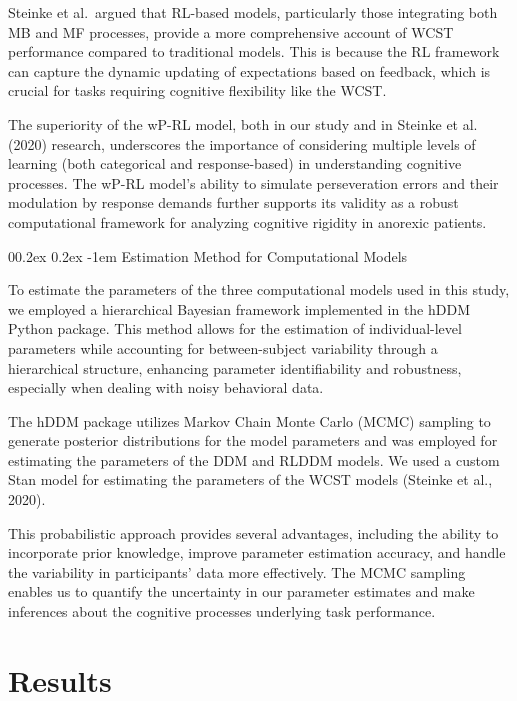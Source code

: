 \documentclass[
  man]{apa6}
\makeatletter
\let\oldparagraph\paragraph
\renewcommand{\paragraph}{
    \@ifstar
      \xxxParagraphStar
      \xxxParagraphNoStar
  }
\newcommand{\xxxParagraphStar}[1]{\oldparagraph*{#1}\mbox{}}
\newcommand{\xxxParagraphNoStar}[1]{\oldparagraph{#1}\mbox{}}
\renewcommand{\paragraph}{\@startsection{paragraph}{4}{\parindent}%
  {0\baselineskip \@plus 0.2ex \@minus 0.2ex}%
  {-1em}%
  {\normalfont\normalsize\bfseries\itshape\typesectitle}}
\makeatother
\begin{document}
Steinke et al.~argued that RL-based models, particularly those integrating both MB and MF processes, provide a more comprehensive account of WCST performance compared to traditional models. This is because the RL framework can capture the dynamic updating of expectations based on feedback, which is crucial for tasks requiring cognitive flexibility like the WCST.

The superiority of the wP-RL model, both in our study and in Steinke et al. (2020) research, underscores the importance of considering multiple levels of learning (both categorical and response-based) in understanding cognitive processes. The wP-RL model's ability to simulate perseveration errors and their modulation by response demands further supports its validity as a robust computational framework for analyzing cognitive rigidity in anorexic patients.

\paragraph{Estimation Method for Computational Models}\label{estimation-method-for-computational-models}

To estimate the parameters of the three computational models used in this study, we employed a hierarchical Bayesian framework implemented in the hDDM Python package. This method allows for the estimation of individual-level parameters while accounting for between-subject variability through a hierarchical structure, enhancing parameter identifiability and robustness, especially when dealing with noisy behavioral data.

The hDDM package utilizes Markov Chain Monte Carlo (MCMC) sampling to generate posterior distributions for the model parameters and was employed for estimating the parameters of the DDM and RLDDM models. We used a custom Stan model for estimating the parameters of the WCST models (Steinke et al., 2020).

This probabilistic approach provides several advantages, including the ability to incorporate prior knowledge, improve parameter estimation accuracy, and handle the variability in participants' data more effectively. The MCMC sampling enables us to quantify the uncertainty in our parameter estimates and make inferences about the cognitive processes underlying task performance.

\section{Results}\label{results}
\end{document}
